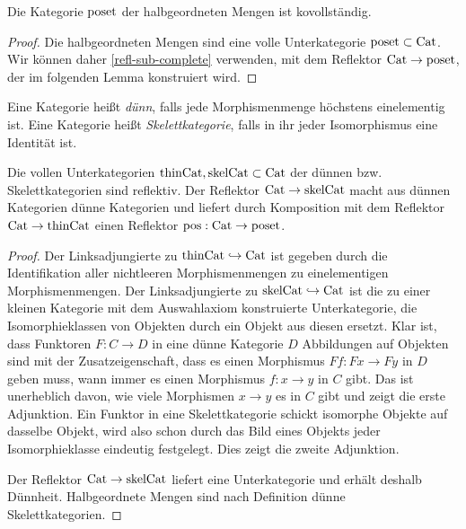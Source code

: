 \begin{prop} \label{poset-cocomplete}
  Die Kategorie $\operatorname{poset}$ der halbgeordneten Mengen ist kovollständig.
\end{prop}
\begin{proof}
  Die halbgeordneten Mengen sind eine volle Unterkategorie $\operatorname{poset}
  \subset \operatorname{Cat}$. Wir können daher \ref{refl-sub-complete} verwenden,
  mit dem Reflektor $\operatorname{Cat} \to \operatorname{poset}$, der im folgenden Lemma
  konstruiert wird.
\end{proof}
\begin{defn}
  Eine Kategorie heißt \emph{dünn}, falls jede Morphismenmenge
  höchs\-tens einelementig ist. Eine Kategorie heißt
  \emph{Skelettkategorie}, falls in ihr jeder Isomorphismus eine
  Identität ist.
\end{defn}
\begin{lemma} \label{poset-reflective}
  Die vollen Unterkategorien $\mathrm{thinCat}, \mathrm{skelCat}
  \subset \operatorname{Cat}$ der dünnen bzw. Skelettkategorien sind reflektiv. Der
  Reflektor $\operatorname{Cat} \to \mathrm{skelCat}$ macht aus dünnen Kategorien
  dünne Kategorien und liefert durch Komposition mit dem Reflektor
  $\operatorname{Cat} \to \mathrm{thinCat}$ einen Reflektor $\operatorname{pos}: \operatorname{Cat} \to \operatorname{poset}$.
\end{lemma}
\begin{proof}
  Der Linksadjungierte zu $\mathrm{thinCat} \hookrightarrow \operatorname{Cat}$ ist gegeben
  durch die Identifikation aller nichtleeren Morphismenmengen zu
  einelementigen Morphismenmengen. Der Linksadjungierte zu
  $\mathrm{skelCat} \hookrightarrow \operatorname{Cat}$ ist die zu einer kleinen Kategorie mit
  dem Auswahlaxiom konstruierte Unterkategorie, die Isomorphieklassen
  von Objekten durch ein Objekt aus diesen ersetzt. Klar ist, dass
  Funktoren $F: C \to D$ in eine dünne Kategorie $D$ Abbildungen auf
  Objekten sind mit der Zusatzeigenschaft, dass es einen Morphismus
  $Ff: Fx \to Fy$ in $D$ geben muss, wann immer es einen Morphismus
  $f: x \to y$ in $C$ gibt. Das ist unerheblich davon, wie viele
  Morphismen $x \to y$ es in $C$ gibt und zeigt die erste
  Adjunktion. Ein Funktor in eine Skelettkategorie schickt isomorphe
  Objekte auf dasselbe Objekt, wird also schon durch das Bild eines
  Objekts jeder Isomorphieklasse eindeutig festgelegt. Dies zeigt die
  zweite Adjunktion.

  Der Reflektor $\operatorname{Cat} \to \mathrm{skelCat}$ liefert eine
  Unterkategorie und erhält deshalb Dünnheit. Halbgeordnete Mengen
  sind nach Definition dünne Skelettkategorien.
\end{proof}

